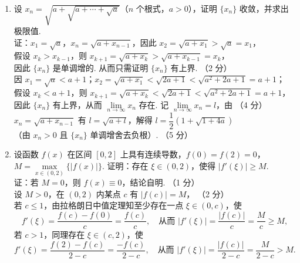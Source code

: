 \documentclass[a4paper,11pt]{ctexart}
\newcommand{\score}[1]{\hfill（#1）}
\begin{document}
\begin{enumerate}[label=\arabic*., start=19, leftmargin=2em, itemsep=1.0em, topsep=0.5em]
  \item 设 $x_n = \sqrt{a + \sqrt{a + \cdots + \sqrt{a}}}$（$n$ 个根式，$a > 0$），证明 $\{x_n\}$ 收敛，并求出极限值.\\[0.3em]
  证：$x_1 = \sqrt{a}$，$x_n = \sqrt{a + x_{n-1}}$，因此 $x_2 = \sqrt{a + x_1} > \sqrt{a} = x_1$，\\[0.3em]
  假设 $x_k > x_{k-1}$，则 $x_{k+1} = \sqrt{a + x_k} > \sqrt{a + x_{k-1}} = x_k$，\\[0.3em]
  因此 $\{x_n\}$ 是单调增的. 从而只需证明 $\{x_n\}$ 有上界. \score{2 分}\\[0.3em]
  因 $x_1 = \sqrt{a} < a + 1$；$x_2 = \sqrt{a + x_1} < \sqrt{2a + 1} < \sqrt{a^2 + 2a + 1} = a + 1$；\\[0.3em]
  假设 $x_k < a + 1$，则 $x_{k+1} = \sqrt{a + x_k} < \sqrt{2a + 1} < \sqrt{a^2 + 2a + 1} = a + 1$，\\[0.3em]
  因此 $\{x_n\}$ 有上界，从而 $\lim\limits_{n\to\infty} x_n$ 存在. 记 $\lim\limits_{n\to\infty} x_n = l$，由 \score{4 分}\\[0.3em]
  $x_n = \sqrt{a + x_{n-1}}$ 有 $l = \sqrt{a + l}$，解得 $l = \dfrac{1}{2}(1 + \sqrt{1+4a})$\\[0.25em]
  （由 $x_n > 0$ 且 $\{x_n\}$ 单调增舍去负根）. \score{5 分}

  \item 设函数 $f(x)$ 在区间 $[0, 2]$ 上具有连续导数，$f(0) = f(2) = 0$，$M = \max\limits_{x\in(0,2)}\{|f(x)|\}$. 证明：存在 $\xi \in (0, 2)$，使得 $|f'(\xi)| \ge M$.\\[0.3em]
  证：若 $M = 0$，则 $f(x) \equiv 0$，结论自明. \score{1 分}\\[0.3em]
  设 $M > 0$，在 $(0, 2)$ 内某点 $c$ 有 $|f(c)| = M$， \score{2 分}\\[0.3em]
  若 $c \le 1$，由拉格朗日中值定理知至少存在一点 $\xi \in (0, c)$，使
  \[
    f'(\xi) = \frac{f(c) - f(0)}{c} = \frac{f(c)}{c}, \quad\text{从而 } |f'(\xi)| = \frac{|f(c)|}{c} = \frac{M}{c} \ge M, \tag*{（4 分）}
  \]
  若 $c > 1$，同理存在 $\xi \in (c, 2)$，使
  \[
    f'(\xi) = \frac{f(2) - f(c)}{2 - c} = \frac{-f(c)}{2 - c}, \quad\text{从而 } |f'(\xi)| = \frac{|f(c)|}{2 - c} = \frac{M}{2 - c} > M. \tag*{（5 分）}
  \]
\end{enumerate}
\end{document}
